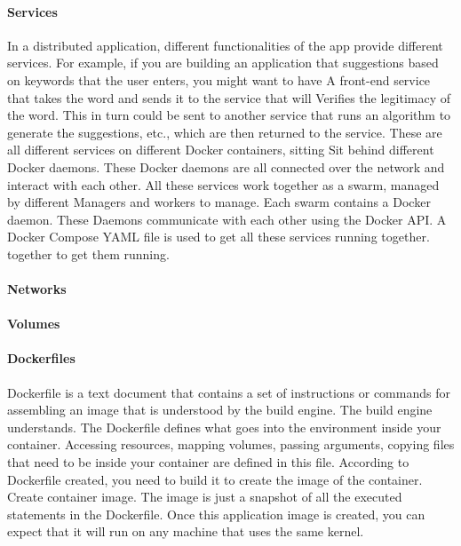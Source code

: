 		\paragraph{Services}
		In a distributed application, different functionalities of the app provide different services. For example, if you are building an application that suggestions based on keywords that the user enters, you might want to have A front-end service that takes the word and sends it to the service that will Verifies the legitimacy of the word. This in turn could be sent to another service that runs an algorithm to generate the suggestions, etc., which are then returned to the service. These are all different services on different Docker containers, sitting Sit behind different Docker daemons. These Docker daemons are all connected over the network and interact with each other.
		All these services work together as a swarm, managed by different Managers and workers to manage. Each swarm contains a Docker daemon. These Daemons communicate with each other using the Docker API. A Docker Compose YAML file is used to get all these services running together. together to get them running. 

		\paragraph{Networks}

		\paragraph{Volumes}
			
			
		\paragraph{Dockerfiles}
		Dockerfile is a text document that contains a set of instructions or commands for assembling an image that is understood by the build engine. The build engine understands. The Dockerfile defines what goes into the environment inside your container. Accessing resources, mapping volumes, passing arguments, copying files that need to be inside your container are defined in this file. According to Dockerfile created, you need to build it to create the image of the container. Create container image. The image is just a snapshot of all the executed statements in the Dockerfile. Once this application image is created, you can expect that it will run on any machine that uses the same kernel. 
		
